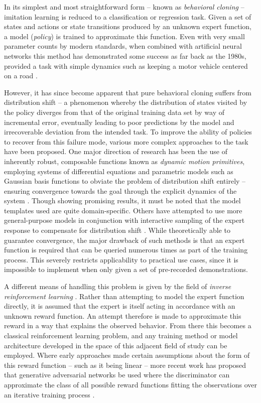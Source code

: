 \documentclass{article}
\begin{document}
In its simplest and most straightforward form -- known as \emph{behavioral cloning} -- imitation learning is reduced to a classification or regression task. Given a set of states and actions or state transitions produced by an unknown expert function, a model (\emph{policy}) is trained to approximate this function. Even with very small parameter counts by modern standards, when combined with artificial neural networks this method has demonstrated some success as far back as the 1980s, provided a task with simple dynamics such as keeping a motor vehicle centered on a road \citep{pomerleau1989alvinn}.

However, it has since become apparent that pure behavioral cloning suffers from distribution shift -- a phenomenon whereby the distribution of states visited by the policy diverges from that of the original training data set by way of incremental error, eventually leading to poor predictions by the model and irrecoverable deviation from the intended task. To improve the ability of policies to recover from this failure mode, various more complex approaches to the task have been proposed. One major direction of research has been the use of inherently robust, composable functions known as \emph{dynamic motion primitives}, employing systems of differential equations and parametric models such as Gaussian basis functions to obviate the problem of distribution shift entirely -- ensuring convergence towards the goal through the explicit dynamics of the system \citep{pastor2009learning}. Though showing promising results, it must be noted that the model templates used are quite domain-specific. Others have attempted to use more general-purpose models in conjunction with interactive sampling of the expert response to compensate for distribution shift \citep{ross2011no}. While theoretically able to guarantee convergence, the major drawback of such methods is that an expert function is required that can be queried numerous times as part of the training process. This severely restricts applicability to practical use cases, since it is impossible to implement when only given a set of pre-recorded demonstrations.

A different means of handling this problem is given by the field of \emph{inverse reinforcement learning} \citep{abbeel2004apprenticeship}. Rather than attempting to model the expert function directly, it is assumed that the expert is itself acting in accordance with an unknown reward function. An attempt therefore is made to approximate this reward in a way that explains the observed behavior. From there this becomes a classical reinforcement learning problem, and any training method or model architecture developed in the space of this adjacent field of study can be employed. Where early approaches made certain assumptions about the form of this reward function -- such as it being linear -- more recent work has proposed that generative adversarial networks be used where the discriminator can approximate the class of all possible reward functions fitting the observations over an iterative training process \citep{ho2016generative}.
\end{document}
